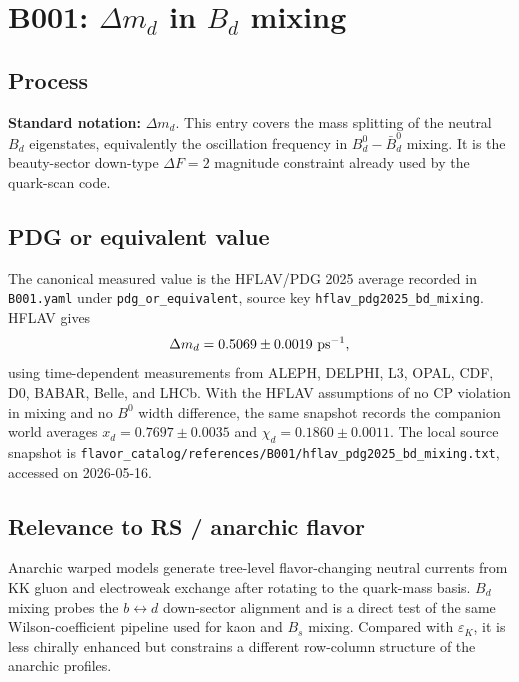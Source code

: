 
\section{B001: \(\Delta m_d\) in \(B_d\) mixing}

\subsection*{Process}
\textbf{Standard notation:} \(\Delta m_d\).
This entry covers the mass splitting of the neutral \(B_d\) eigenstates,
equivalently the oscillation frequency in \(B^0_d-\bar B^0_d\) mixing.  It is
the beauty-sector down-type \(\Delta F=2\) magnitude constraint already used by
the quark-scan code.

\subsection*{PDG or equivalent value}
The canonical measured value is the HFLAV/PDG 2025 average recorded in
\texttt{B001.yaml} under \texttt{pdg\_or\_equivalent}, source key
\texttt{hflav\_pdg2025\_bd\_mixing}.  HFLAV gives
\[
  \Delta m_d = 0.5069 \pm 0.0019\ {\rm ps}^{-1},
\]
using time-dependent measurements from ALEPH, DELPHI, L3, OPAL, CDF, D0,
BABAR, Belle, and LHCb.  With the HFLAV assumptions of no CP violation in
mixing and no \(B^0\) width difference, the same snapshot records the companion
world averages \(x_d=0.7697\pm0.0035\) and \(\chi_d=0.1860\pm0.0011\).  The
local source snapshot is
\texttt{flavor\_catalog/references/B001/hflav\_pdg2025\_bd\_mixing.txt},
accessed on 2026-05-16.

\subsection*{Relevance to RS / anarchic flavor}
Anarchic warped models generate tree-level flavor-changing neutral currents
from KK gluon and electroweak exchange after rotating to the quark-mass basis.
\(B_d\) mixing probes the \(b\leftrightarrow d\) down-sector alignment and is a
direct test of the same Wilson-coefficient pipeline used for kaon and \(B_s\)
mixing.  Compared with \(\varepsilon_K\), it is less chirally enhanced but
constrains a different row-column structure of the anarchic profiles.

